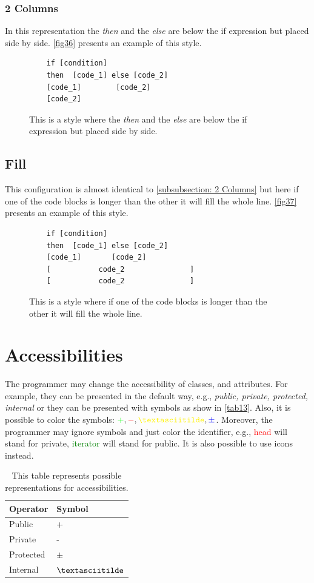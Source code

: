 \subsubsection{2 Columns} \label{subsubsection: 2 Columns}
In this representation the \textit{then} and the \textit{else} are below the if expression but placed side by side. \autoref{fig36} presents an example of this style.
\begin{figure}[H]
	\begin{lstlisting}
	if [condition]
	then  [code_1] else [code_2]
	[code_1]        [code_2]
	[code_2]
	\end{lstlisting}
	\caption{This is a style where the \textit{then} and the \textit{else} are below the if expression but placed side by side.}
	\label{fig36}
\end{figure}
\subsection{Fill}
This configuration is almost identical to \autoref{subsubsection: 2 Columns} but here if one of the code blocks is longer than the other it will fill the whole line. \autoref{fig37} presents an example of this style.
\begin{figure}[H]
	\begin{lstlisting}
	if [condition]
	then  [code_1] else [code_2]
	[code_1]       [code_2]
	[			code_2			     ]
	[			code_2			     ]
	\end{lstlisting}
	\caption{This is a style where if one of the code blocks is longer than the other it will fill the whole line.}
	\label{fig37}
\end{figure}
\section{Accessibilities}
The programmer may change the accessibility of classes, and attributes. For example, they can be presented in the default way, e.g., \textit{public, private, protected, internal} or they can be presented with symbols as show in \autoref{tab13}. Also, it is possible to color the symbols:
$ \textcolor{green}{+}, \textcolor{red}{-}, \textcolor{yellow}{\textasciitilde}, \textcolor{blue}{\pm} $. Moreover, the programmer may ignore symbols and just color the identifier, e.g., \textcolor{red}{head} will stand for private, \textcolor{green}{iterator} will stand for public. It is also possible to use icons instead.
\begin{table}[H]
	\centering
	\begin{tabular}{|l|l|}
		\hline
		{\bf Operator} & {\bf Symbol} \\ \hline
		Public & + \\ \hline
		Private & - \\ \hline
		Protected & $ \pm $ \\ \hline
		Internal & $ \textasciitilde $ \\ \hline
	\end{tabular}
	\caption{This table represents possible representations for accessibilities.}
	\label{tab13}
\end{table}
